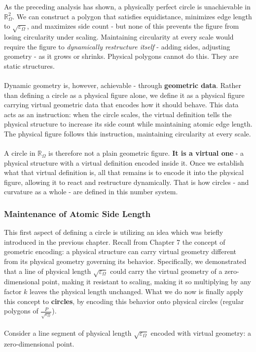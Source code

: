\documentclass{article}
\begin{document}
As the preceding analysis has shown, a physically perfect circle is 
unachievable in $\mathbb{R}_\Omega^2$. We can construct a polygon that 
satisfies equidistance, minimizes edge length to $\sqrt{\varepsilon_\Omega}$, 
and maximizes side count - but none of this prevents the figure from losing 
circularity under scaling. Maintaining circularity at every scale would require 
the figure to \textit{dynamically restructure itself} - adding sides, adjusting 
geometry - as it grows or shrinks. Physical polygons cannot do this. They are 
static structures.\\\\
Dynamic geometry is, however, achievable - through \textbf{geometric data}. 
Rather than defining a circle as a physical figure alone, we define it as a 
physical figure carrying virtual geometric data that encodes how it should 
behave. This data acts as an instruction: when the circle scales, the virtual 
definition tells the physical structure to increase its side count while 
maintaining atomic edge length. The physical figure follows this instruction, 
maintaining circularity at every scale.\\\\
A circle in $\mathbb{R}_\Omega$ is therefore not a plain geometric figure. 
\textbf{It is a virtual one} - a physical structure with a virtual definition 
encoded inside it. Once we establish what that virtual definition is, all that 
remains is to encode it into the physical figure, allowing it to react and 
restructure dynamically. That is how circles - and curvature as a whole - are 
defined in this number system.

\subsubsection{Maintenance of Atomic Side Length}

This first aspect of defining a circle is utilizing an idea which was briefly introduced in the previous chapter. Recall from Chapter 7 the concept of geometric encoding: a physical structure can carry virtual geometry different from its physical geometry  governing its behavior. Specifically, we demonstrated that a line of physical length $\sqrt{\varepsilon_\Omega}$ could carry the virtual geometry of a zero-dimensional point, making it resistant to scaling, making it so multiplying by any factor $k$ leaves the physical length unchanged. What we do now is finally apply this concept to \textbf{circles}, by encoding this behavior onto physical circles (regular polygons of $\frac{P}{\sqrt{\varepsilon_\Omega}}$).\\\\Consider a line segment of physical length $\sqrt{\varepsilon_\Omega}$ encoded with virtual geometry: a zero-dimensional point.
\end{document}

